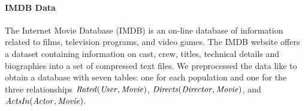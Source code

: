 \documentclass[conference]{IEEEtran}
\begin{document}
				\paragraph{IMDB Data} 
The Internet Movie Database (IMDB) is an on-line database of information related to films, television programs, and video games.
The IMDB website offers a dataset containing information on cast, crew, titles, technical details and biographies into a set of compressed text files. 
We preprocessed the data like \cite{Peralta2007} to obtain a database with seven tables: one for each population and one for the three relationships $\it{Rated}(\it{User},\it{Movie})$, $\it{Directs}(\it{Director},\it{Movie})$, and $\it{ActsIn}(\mathit{Actor},\it{Movie})$.
				
%				
					
\end{document}

